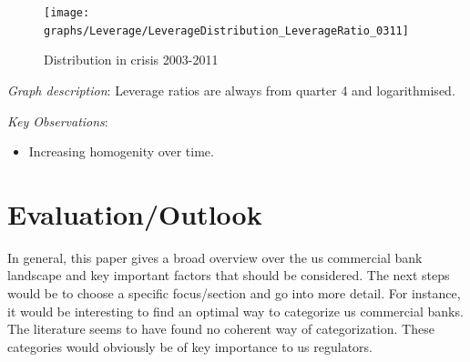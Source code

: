 \documentclass[12pt, a4paper]{article} %
\begin{document}
\pagebreak


\begin{figure}[hbtp]
\centering
\caption{Distribution in crisis 2003-2011}
\texttt{[image: graphs/Leverage/LeverageDistribution\_LeverageRatio\_0311]}
\end{figure}

\noindent \textit{Graph description}: Leverage ratios are always from quarter 4 and  logarithmised.

\noindent \textit{Key Observations}:
\begin{itemize}
\item Increasing homogenity over time.
\end{itemize}

\section{Evaluation/Outlook}

In general, this paper gives a broad overview over the us commercial bank landscape and key important factors that should be considered. The next steps would be to choose a specific focus/section and go into more detail. For instance, it would be interesting to find an optimal way to categorize us commercial banks. The literature seems to have found no coherent way of categorization. These categories would obviously be of key importance to us regulators.
\end{document}
